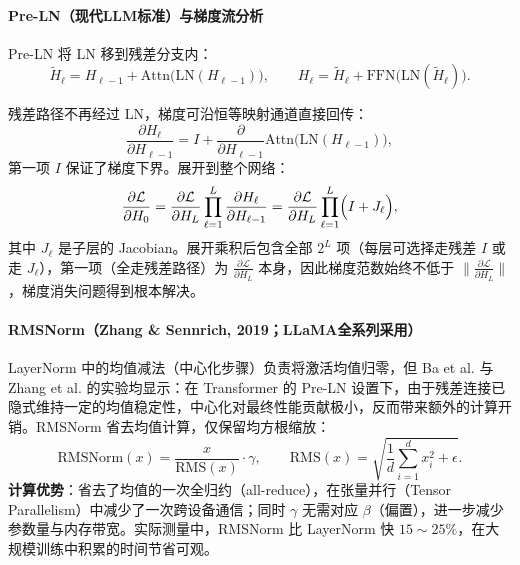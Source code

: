 \documentclass[12pt,a4paper]{article}
\begin{document}
\paragraph{Pre-LN（现代LLM标准）与梯度流分析}

Pre-LN 将 LN 移到残差分支内：
\begin{equation}
\tilde{H}_\ell = H_{\ell-1} + \mathrm{Attn}\!\bigl(\mathrm{LN}(H_{\ell-1})\bigr),\qquad
H_\ell = \tilde{H}_\ell + \mathrm{FFN}\!\bigl(\mathrm{LN}(\tilde{H}_\ell)\bigr).
\end{equation}

残差路径不再经过 LN，梯度可沿恒等映射通道直接回传：
\begin{equation}
\frac{\partial H_\ell}{\partial H_{\ell-1}} = I + \frac{\partial}{\partial H_{\ell-1}}\mathrm{Attn}\!\bigl(\mathrm{LN}(H_{\ell-1})\bigr),
\end{equation}
第一项 $I$ 保证了梯度下界。展开到整个网络：
\begin{equation}
\frac{\partial \mathcal{L}}{\partial H_0}
= \frac{\partial \mathcal{L}}{\partial H_L} \prod_{\ell=1}^{L} \frac{\partial H_\ell}{\partial H_{\ell-1}}
= \frac{\partial \mathcal{L}}{\partial H_L} \prod_{\ell=1}^{L} \Bigl(I + J_\ell\Bigr),
\end{equation}
其中 $J_\ell$ 是子层的 Jacobian。展开乘积后包含全部 $2^L$ 项（每层可选择走残差 $I$ 或走 $J_\ell$），第一项（全走残差路径）为 $\frac{\partial \mathcal{L}}{\partial H_L}$ 本身，因此梯度范数始终不低于 $\|\frac{\partial \mathcal{L}}{\partial H_L}\|$，梯度消失问题得到根本解决。

\paragraph{RMSNorm（Zhang \& Sennrich, 2019；LLaMA全系列采用）}

LayerNorm 中的均值减法（中心化步骤）负责将激活均值归零，但 Ba et al. 与 Zhang et al. 的实验均显示：在 Transformer 的 Pre-LN 设置下，由于残差连接已隐式维持一定的均值稳定性，中心化对最终性能贡献极小，反而带来额外的计算开销。RMSNorm 省去均值计算，仅保留均方根缩放：
\begin{equation}
\mathrm{RMSNorm}(x) = \frac{x}{\mathrm{RMS}(x)} \cdot \gamma,\qquad \mathrm{RMS}(x) = \sqrt{\frac{1}{d}\sum_{i=1}^d x_i^2 + \epsilon}.
\end{equation}
\textbf{计算优势}：省去了均值的一次全归约（all-reduce），在张量并行（Tensor Parallelism）中减少了一次跨设备通信；同时 $\gamma$ 无需对应 $\beta$（偏置），进一步减少参数量与内存带宽。实际测量中，RMSNorm 比 LayerNorm 快 $15\sim25\%$，在大规模训练中积累的时间节省可观。
\end{document}
